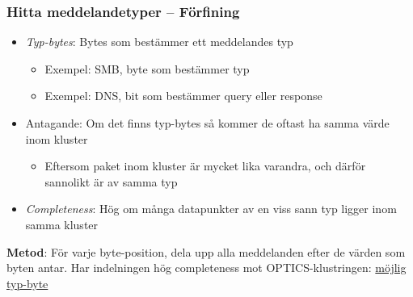 \documentclass[xetex, 8pt]{beamer}
\begin{document}
    \begin{frame}
        \frametitle{Hitta meddelandetyper -- Förfining}
        \begin{itemize}
            \item \emph{Typ-bytes}: Bytes som bestämmer ett meddelandes typ \\
                \begin{itemize}
                    \item Exempel: SMB, byte som bestämmer typ
                    \item Exempel: DNS, bit som bestämmer query eller response
                \end{itemize}
            \item Antagande: Om det finns typ-bytes så kommer de oftast ha
                samma värde inom kluster \\
                \begin{itemize}
                    \item Eftersom paket inom kluster är mycket lika varandra,
                        och därför sannolikt är av samma typ
                \end{itemize}
            \item \emph{Completeness}: Hög om många datapunkter av en viss
                sann typ ligger inom samma kluster
        \end{itemize}
        \vskip20pt
        \textbf{Metod}: För varje byte-position, dela upp alla meddelanden
        efter de värden som byten antar. Har indelningen hög completeness mot
        OPTICS-klustringen: \underline{möjlig typ-byte}
    \end{frame}
\end{document}
